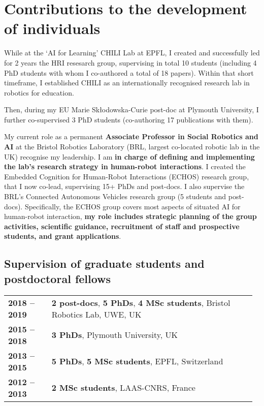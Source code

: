 \vspace{2em}
\section{Contributions to the development of individuals}

While at the `AI for Learning' CHILI Lab at EPFL, I created and successfully
led for 2 years the HRI resesarch group, supervising in total
10 students (including 4 PhD students with whom I co-authored a total of 18
papers). Within that short timeframe, I established CHILI as an internationally
recognised research lab in robotics for education. 

Then, during my EU Marie Skłodowska-Curie post-doc at Plymouth University, I
further co-supervised 3 PhD students (co-authoring 17 publications with them).

My current role as a permanent \textbf{Associate Professor in Social Robotics
and AI} at the Bristol Robotics Laboratory (BRL, largest co-located robotic lab
in the UK) recognise my leadership. I am \textbf{in charge of defining and
implementing the lab's research strategy in human-robot interactions}. I created
the Embedded Cognition for Human-Robot Interactions (ECHOS) research group, that
I now co-lead, supervising 15+ PhDs and post-docs. I also supervise the BRL's
Connected Autonomous Vehicles research group (5 students and post-docs).
Specifically, the ECHOS group covers most aspects of situated AI for human-robot
interaction, \textbf{my role includes strategic planning of the group
activities, scientific guidance, recruitment of staff and prospective students,
and grant applications}.

\subsection{Supervision of graduate students and postdoctoral fellows}

\begin{tabular}{p{0.17\linewidth}p{0.8\linewidth}}
    \bf 2018 -- 2019 & \textbf{2 post-docs}, \textbf{5 PhDs}, \textbf{4 MSc students}, Bristol Robotics Lab, UWE, UK \\
    \bf 2015 -- 2018 & \textbf{3 PhDs}, Plymouth University, UK \\
    \bf 2013 -- 2015 & \textbf{5 PhDs}, \textbf{5 MSc students}, EPFL, Switzerland \\
    \bf 2012 -- 2013 & \textbf{2 MSc students}, LAAS-CNRS, France \\
\end{tabular}


